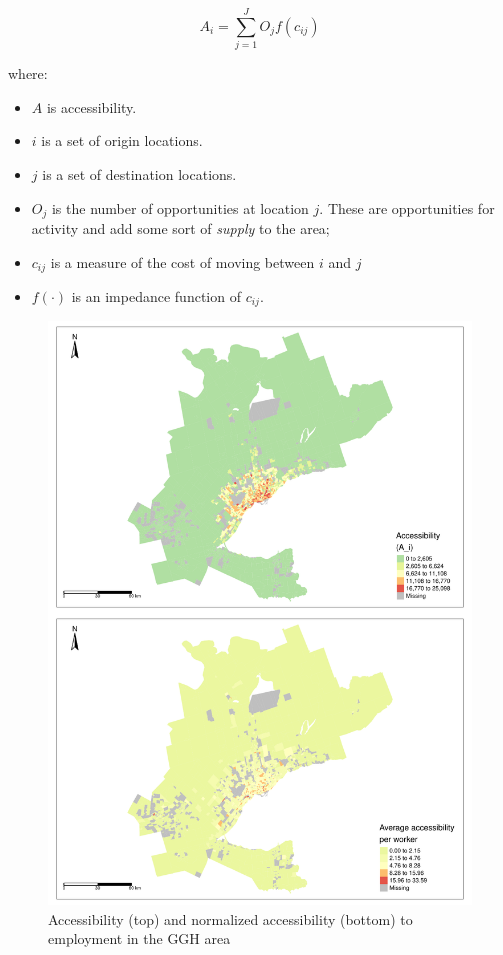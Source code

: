 \documentclass[Royal,times,sageh]{sagej}
\providecommand{\tightlist}{%
  \setlength{\itemsep}{0pt}\setlength{\parskip}{0pt}}
\begin{document}
\begin{equation}
\label{eq:conventional-accessibility}
A_i = \sum_{j=1}^JO_jf(c_{ij})
\end{equation}

\noindent where:

\begin{itemize}
\tightlist
\item
  \(A\) is accessibility.
\item
  \(i\) is a set of origin locations.
\item
  \(j\) is a set of destination locations.
\item
  \(O_j\) is the number of opportunities at location \(j\). These are
  opportunities for activity and add some sort of \emph{supply} to the
  area;
\item
  \(c_{ij}\) is a measure of the cost of moving between \(i\) and \(j\)
\item
  \(f(\cdot)\) is an impedance function of \(c_{ij}\).
\end{itemize}

\begin{figure}
\includegraphics[width=1\linewidth]{Manuscript-Data-Package_files/figure-latex/plot-access-SA-GGH-TTS-1} \caption{\label{fig:plot-access-SA-GGH-TTS}Accessibility (top) and normalized accessibility (bottom) to employment in the GGH area}\label{fig:plot-access-SA-GGH-TTS}
\end{figure}
\newpage
\end{document}
